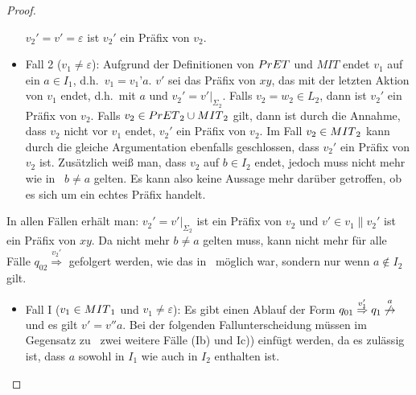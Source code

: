 \begin{proof}
\begin{itemize}
      $v_2'=v'=\varepsilon$ ist $v_2'$ ein Präfix von $v_2$.
    \item Fall 2 ($v_1\neq\varepsilon$): Aufgrund der Definitionen von $PrET{}$
      und $MIT$ endet $v_1$ auf ein $a\in I_1$, d.h.\ $v_1=v_1’a$. $v'$ sei das
      Präfix von $xy$, das mit der letzten Aktion von $v_1$ endet, d.h.\ mit
      $a$ und $v_2'=v'|_{\Sigma _{2}}$. Falls $v_2 = w_2\in L_2$, dann ist
      $v_2'$ ein Präfix von $v_2$. Falls $v_2\in
      PrET{}_2\cup MIT{}_2$ gilt, dann ist durch die Annahme, dass $v_2$ nicht vor
      $v_1$ endet, $v_2'$ ein Präfix von $v_2$. Im Fall $v_2\in MIT{}_2$ kann
      durch die gleiche Argumentation ebenfalls geschlossen, dass $v_2'$ ein
      Präfix von $v_2$ ist. Zusätzlich weiß man, dass $v_2$ auf $b\in
      I_2$ endet, jedoch muss nicht mehr wie in~\cite{Vogler2014EIO} $b\neq a$
      gelten. Es kann also keine Aussage mehr darüber getroffen, ob es sich um
      ein echtes Präfix handelt.
  \end{itemize}
  In allen Fällen erhält man: $v_2'=v'|_{\Sigma _2}$ ist ein Präfix von $v_2$
  und $v'\in v_1\| v_2'$ ist ein Präfix von $xy$. Da nicht mehr $b\neq a$
  gelten muss, kann nicht mehr für alle Fälle $q_{02}
  \overset{v_2'}{\Rightarrow}$ gefolgert werden, wie das
  in~\cite{Vogler2014EIO} möglich war, sondern nur wenn $a\notin I_2$ gilt.
  \begin{itemize}
    \item Fall I ($v_1\in MIT{}_1$ und $v_1\neq\varepsilon$): Es gibt einen
      Ablauf der Form $q_{01} \overset{v_1'}{\Rightarrow}q_1
      \overset{a}{\not{\hspace{-0.1cm}\rightarrow}}$ und es gilt $v'=v''a$. Bei der
      folgenden Fallunterscheidung müssen im Gegensatz zu~\cite{Vogler2014EIO}
      zwei weitere Fälle (Ib) und Ic)) einfügt werden, da es zulässig ist, dass $a$
      sowohl in $I_1$ wie auch in $I_2$ enthalten ist.
\end{itemize}
\end{proof}
